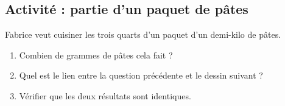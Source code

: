 
\subsection*{Activité : partie d'un paquet de pâtes}

Fabrice veut cuisiner les trois quarts d'un paquet d'un demi-kilo de pâtes.
\begin{enumerate}
    \item
        Combien de grammes de pâtes cela fait ?
    \item
        Quel est le lien entre la question précédente et le dessin suivant ?
        \begin{center}
              
        \end{center}
    \item
        Vérifier que les deux résultats sont identiques.
\end{enumerate}
